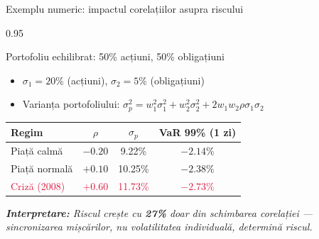 \documentclass[9pt, aspectratio=169, t]{beamer}
\begin{document}
\begin{frame}{Exemplu numeric: impactul corelațiilor asupra riscului}
    \begin{cminipage}{0.95\textwidth}
    {\footnotesize
    \begin{exampleblock}{Portofoliu echilibrat: 50\% acțiuni, 50\% obligațiuni}
        \begin{itemize}\setlength{\itemsep}{0pt}
            \item $\sigma_1 = 20\%$ (acțiuni), $\sigma_2 = 5\%$ (obligațiuni)
            \item Varianța portofoliului: $\sigma_p^2 = w_1^2\sigma_1^2 + w_2^2\sigma_2^2 + 2w_1w_2\rho\sigma_1\sigma_2$
        \end{itemize}
        \vspace{0.1cm}
        \begin{center}
        \begin{tabular}{lccc}
            \hline
            \textbf{Regim} & \textbf{$\rho$} & \textbf{$\sigma_p$} & \textbf{VaR 99\% (1 zi)} \\
            \hline
            Piață calmă & $-0.20$ & 9.22\% & $-2.14\%$ \\
            Piață normală & $+0.10$ & 10.25\% & $-2.38\%$ \\
            \textcolor{Crimson}{Criză (2008)} & \textcolor{Crimson}{$+0.60$} & \textcolor{Crimson}{11.73\%} & \textcolor{Crimson}{$-2.73\%$} \\
            \hline
        \end{tabular}
        \end{center}
    \end{exampleblock}
    \vspace{0.1cm}
    \textit{\textbf{Interpretare:} Riscul crește cu \textbf{27\%} doar din schimbarea corelației --- sincronizarea mișcărilor, nu volatilitatea individuală, determină riscul.}
    }
    \end{cminipage}
\end{frame}
\end{document}
